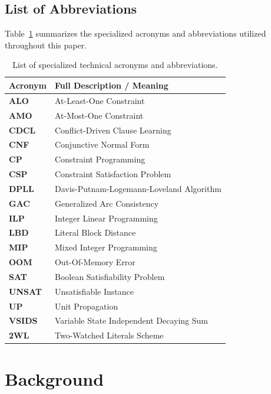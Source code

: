 \documentclass[a4paper,fleqn]{cas-sc}
\begin{document}
\subsection{List of Abbreviations}
\label{subsec:abbreviations}
Table~\ref{tab:abbreviations} summarizes the specialized acronyms and abbreviations utilized throughout this paper.

\begin{table}[pos=htbp]
\centering
\caption{List of specialized technical acronyms and abbreviations.}
\label{tab:abbreviations}
\begin{tabular}{ll}
\toprule
\textbf{Acronym} & \textbf{Full Description / Meaning} \\
\midrule
\textbf{ALO} & At-Least-One Constraint \\
\textbf{AMO} & At-Most-One Constraint \\
\textbf{CDCL} & Conflict-Driven Clause Learning \\
\textbf{CNF} & Conjunctive Normal Form \\
\textbf{CP} & Constraint Programming \\
\textbf{CSP} & Constraint Satisfaction Problem \\
\textbf{DPLL} & Davis-Putnam-Logemann-Loveland Algorithm \\
\textbf{GAC} & Generalized Arc Consistency \\
\textbf{ILP} & Integer Linear Programming \\
\textbf{LBD} & Literal Block Distance \\
\textbf{MIP} & Mixed Integer Programming \\
\textbf{OOM} & Out-Of-Memory Error \\
\textbf{SAT} & Boolean Satisfiability Problem \\
\textbf{UNSAT} & Unsatisfiable Instance \\
\textbf{UP} & Unit Propagation \\
\textbf{VSIDS} & Variable State Independent Decaying Sum \\
\textbf{2WL} & Two-Watched Literals Scheme \\
\bottomrule
\end{tabular}
\end{table}

\section{Background}
\label{sec:background}
\end{document}
